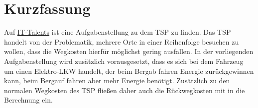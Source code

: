 \section*{Kurzfassung}\thispagestyle{empty}
    \label{chap:kurzfassung}

    Auf \href{https://www.it-talents.de/foerderung/code-competition/code-competition-04-2018}{IT-Talents} ist eine Aufgabenstellung zu dem \acf{TSP} zu finden. Das \acl{TSP} handelt von der Problematik, mehrere Orte in einer Reihenfolge besuchen zu wollen, dass die Wegkosten hierfür möglichst gering ausfallen. In der vorliegenden Aufgabenstellung wird zusätzlich vorausgesetzt, dass es sich bei dem Fahrzeug um einen Elektro-LKW handelt, der beim Bergab fahren Energie zurückgewinnen kann, beim Bergauf fahren aber mehr Energie benötigt. Zusätzlich zu den normalen Wegkosten des \acl{TSP} fließen daher auch die Rückwegkosten mit in die Berechnung ein.
    
    \vfill
